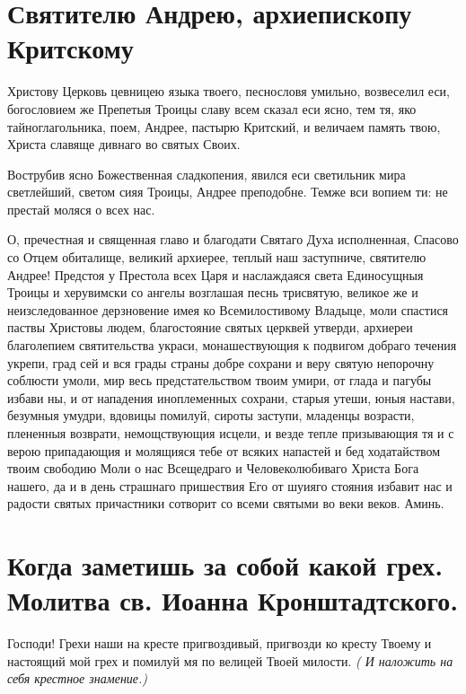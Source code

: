 \section{Святителю  Андрею, архиепископу Критскому}\begin{mymulticols}


Христову Церковь цевницею языка твоего, песнословя умильно, возвеселил еси, богословием же Препетыя Троицы славу всем сказал еси ясно, тем тя, яко тайноглагольника, поем, Андрее, пастырю Критский, и величаем память твою, Христа славяще дивнаго во святых Своих.


Вострубив ясно Божественная сладкопения, явился еси светильник мира светлейший, светом сияя Троицы, Андрее преподобне. Темже вси вопием ти: не престай моляся о всех нас.


О, пречестная и священная главо и благодати Святаго Духа исполненная, Спасово со Отцем обиталище, великий архиерее, теплый наш заступниче, святителю Андрее! Предстоя у Престола всех Царя и наслаждаяся света Единосущныя Троицы и херувимски со ангелы возглашая песнь трисвятую, великое же и неизследованное дерзновение имея ко Всемилостивому Владыце, моли спастися паствы Христовы людем, благостояние святых церквей утверди, архиереи благолепием святительства украси, монашествующия к подвигом добраго течения укрепи, град сей и вся грады страны добре сохрани и веру святую непорочну соблюсти умоли, мир весь предстательством твоим умири, от глада и пагубы избави ны, и от нападения иноплеменных сохрани, старыя утеши, юныя настави, безумныя умудри, вдовицы помилуй, сироты заступи, младенцы возрасти, плененныя возврати, немощствующия исцели, и везде тепле призывающия тя и с верою припадающия и молящияся тебе от всяких напастей и бед ходатайством твоим свободию Моли о нас Всещедраго и Человеколюбиваго Христа Бога нашего, да и в день страшнаго пришествия Его от шуияго стояния избавит нас и радости святых причастники сотворит со всеми святыми во веки веков. Аминь.

\end{mymulticols}

\section{Когда заметишь за собой какой грех. Молитва св. Иоанна Кронштадтского.}\begin{mymulticols}

Господи! Грехи наши на кресте пригвоздивый, пригвозди ко кресту Твоему и настоящий мой грех и помилуй мя по велицей Твоей милости. {\itshape( И наложить на себя крестное знамение.)}

\end{mymulticols}

